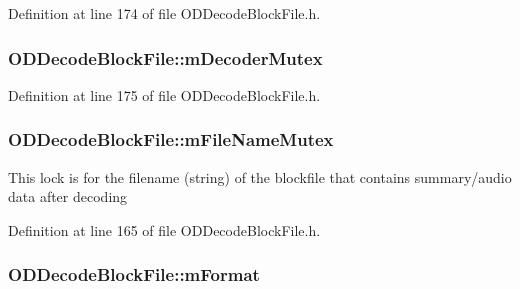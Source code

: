 Definition at line 174 of file O\+D\+Decode\+Block\+File.\+h.

\subsubsection[{\texorpdfstring{m\+Decoder\+Mutex}{mDecoderMutex}}]{ O\+D\+Decode\+Block\+File\+::m\+Decoder\+Mutex\hspace{0.3cm}{\ttfamily [protected]}}\hypertarget{class_o_d_decode_block_file_a84c27aeea3fe441d208b3b17cd894f6a}{}\label{class_o_d_decode_block_file_a84c27aeea3fe441d208b3b17cd894f6a}


Definition at line 175 of file O\+D\+Decode\+Block\+File.\+h.

\subsubsection[{\texorpdfstring{m\+File\+Name\+Mutex}{mFileNameMutex}}]{ O\+D\+Decode\+Block\+File\+::m\+File\+Name\+Mutex\hspace{0.3cm}{\ttfamily [protected]}}\hypertarget{class_o_d_decode_block_file_af3693d7c2dae8daf3c7f0dd83462b7ee}{}\label{class_o_d_decode_block_file_af3693d7c2dae8daf3c7f0dd83462b7ee}
This lock is for the filename (string) of the blockfile that contains summary/audio data after decoding 

Definition at line 165 of file O\+D\+Decode\+Block\+File.\+h.

\subsubsection[{\texorpdfstring{m\+Format}{mFormat}}]{ O\+D\+Decode\+Block\+File\+::m\+Format\hspace{0.3cm}{\ttfamily [protected]}}\hypertarget{class_o_d_decode_block_file_a3e9e037c878345d5fe53457da1dc9c60}{}\label{class_o_d_decode_block_file_a3e9e037c878345d5fe53457da1dc9c60}


